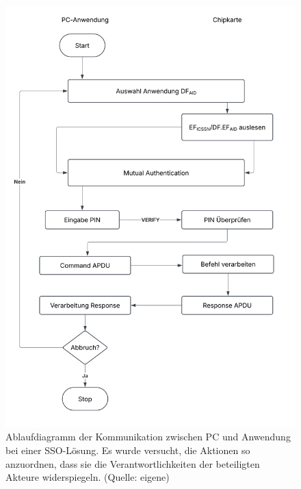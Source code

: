 \begin{figure}
    \centering
    \includegraphics[scale=0.3]{aufgabe 3/img/ablaufdiagramm.svg}
    \caption{Ablaufdiagramm der Kommunikation zwischen PC und Anwendung bei einer SSO-Lösung. Es wurde versucht, die Aktionen so anzuordnen, dass sie die Verantwortlichkeiten der beteiligten Akteure widerspiegeln. (Quelle: eigene)}
    \label{fig:ablaufdiagramm}
\end{figure}